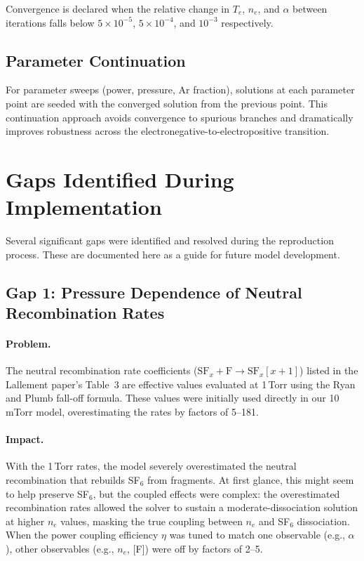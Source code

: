 \documentclass[11pt,a4paper]{article}
\newcommand{\SFx}{\mathrm{SF}_x}
\newcommand{\Te}{T_e}
\newcommand{\nelec}{n_e}
\begin{document}
Convergence is declared when the relative change in $\Te$, $\nelec$, and $\alpha$ between iterations falls below $5 \times 10^{-5}$, $5 \times 10^{-4}$, and $10^{-3}$ respectively.

\subsection{Parameter Continuation}

For parameter sweeps (power, pressure, Ar fraction), solutions at each parameter point are seeded with the converged solution from the previous point.  This continuation approach avoids convergence to spurious branches and dramatically improves robustness across the electronegative-to-electropositive transition.

\section{Gaps Identified During Implementation}
\label{sec:gaps}

Several significant gaps were identified and resolved during the reproduction process.  These are documented here as a guide for future model development.

\subsection{Gap 1: Pressure Dependence of Neutral Recombination Rates}

\paragraph{Problem.} The neutral recombination rate coefficients ($\SFx + \mathrm{F} \to \SFx[x+1]$) listed in the Lallement paper's Table~3 are effective values evaluated at 1\,Torr using the Ryan and Plumb fall-off formula.  These values were initially used directly in our 10\,mTorr model, overestimating the rates by factors of 5--181.

\paragraph{Impact.} With the 1\,Torr rates, the model severely overestimated the neutral recombination that rebuilds SF$_6$ from fragments.  At first glance, this might seem to help preserve SF$_6$, but the coupled effects were complex: the overestimated recombination rates allowed the solver to sustain a moderate-dissociation solution at higher $\nelec$ values, masking the true coupling between $\nelec$ and SF$_6$ dissociation.  When the power coupling efficiency $\eta$ was tuned to match one observable (e.g., $\alpha$), other observables (e.g., $\nelec$, [F]) were off by factors of 2--5.
\end{document}
